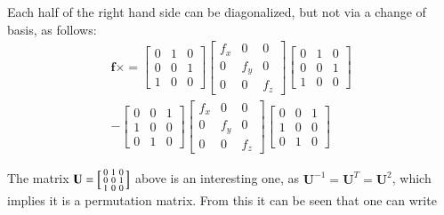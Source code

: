 \documentclass{article}      %
\newcommand{\Bf}[0]{\mathbf{f}}
\newcommand{\BU}[0]{\mathbf{U}}
\newcommand{\cross}[0]{\times}
\begin{document}
Each half of the right hand side can be diagonalized, but not via a change of basis, as follows:
\begin{multline*}
\Bf \cross =
\begin{bmatrix}
0 & 1 & 0 \\
0 & 0 & 1 \\
1 & 0 & 0
\end{bmatrix}
\begin{bmatrix}
f_x & 0 & 0 \\
0 & f_y & 0 \\
0 & 0 & f_z
\end{bmatrix}
\begin{bmatrix}
0 & 1 & 0 \\
0 & 0 & 1 \\
1 & 0 & 0
\end{bmatrix} \\
-
\begin{bmatrix}
0 & 0 & 1 \\
1 & 0 & 0 \\
0 & 1 & 0
\end{bmatrix}
\begin{bmatrix}
f_x & 0 & 0 \\
0 & f_y & 0 \\
0 & 0 & f_z
\end{bmatrix}
\begin{bmatrix}
0 & 0 & 1 \\
1 & 0 & 0 \\
0 & 1 & 0
\end{bmatrix}
\end{multline*}

The matrix
$ \BU =
\Bigl[
\begin{smallmatrix}
0 & 1 & 0 \\
0 & 0 & 1 \\
1 & 0 & 0
\end{smallmatrix}
\Bigr]
$ above is an interesting one, as $\BU^{-1} = \BU^T = \BU^2$, which implies it is a permutation matrix.
From this it can be seen that one can write
\end{document}

